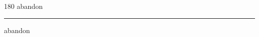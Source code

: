 
\begin{frame}
\begin{center}
\begin{turn}{180}
{\fontsize{2.5cm}{1em}\selectfont abandon}
\end{turn}
\vspace{1em}\par  
\hrule
\vspace{1em}\par  
{\fontsize{2.5cm}{1em}\selectfont abandon}
\end{center}
\end{frame}
